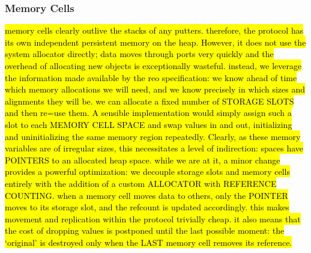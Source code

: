 \subsubsection{Memory Cells}
\label{sec:memory_cells}

\hl{
memory cells clearly outlive the stacks of any putters. therefore, the protocol has its own independent persistent memory on the heap. However, it does not use the system allocator directly; data moves through ports very quickly and the overhead of allocating new objects is exceptionally wasteful. instead, we leverage the information made available by the reo specification: we know ahead of time which memory allocations we will need, and we know precisely in which sizes and alignments they will be. we can allocate a fixed number of STORAGE SLOTS and then re=use them. A sensible implementation would simply assign such a slot to each MEMORY CELL SPACE and swap values in and out, initializing and uninitializing the same memory region repeatedly. Clearly, as these memory variables are of irregular sizes, this necessitates a level of indirection: spaces have POINTERS to an allocated heap space. while we are at it, a minor change provides a powerful optimization: we decouple storage slots and memory cells entirely with the addition of a custom ALLOCATOR with REFERENCE COUNTING. when a memory cell moves data to others, only the POINTER moves to its storage slot, and the refcount is updated accordingly. this makes movement and replication within the protocol trivially cheap. it also means that the cost of dropping values is postponed until the last possible moment: the `original' is destroyed only when the LAST memory cell removes its reference.
}
